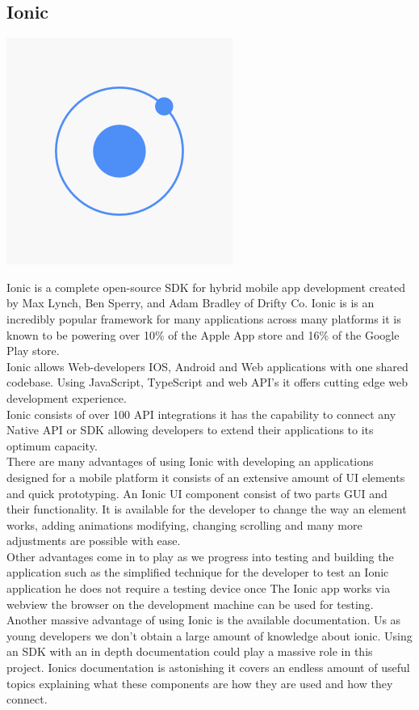 \documentclass[a4paper,12pt]{report}
\begin{document}
\subsection{Ionic}
\includegraphics[scale=.1]{images/ionic.png}

Ionic is a complete open-source SDK for hybrid mobile app development created by Max Lynch, Ben Sperry, and Adam Bradley of Drifty Co.
Ionic is is an incredibly popular framework for many applications across many platforms it is known to be powering over 10\% of the Apple App store and 16\% of the Google Play store.\\
Ionic allows Web-developers IOS, Android and Web applications with one shared codebase. Using JavaScript, TypeScript and web API's it offers cutting edge web development experience.\\
Ionic consists of over 100 API integrations it has the capability to connect any Native API or SDK allowing developers to extend their applications to its optimum capacity.\cite{ionicInsight}\\

There are many advantages of using Ionic with developing an applications designed for a mobile platform it consists of an extensive amount of UI elements and quick prototyping. An Ionic UI component consist of two parts GUI and their functionality. It is available for the developer to change the way an element works, adding animations modifying, changing scrolling and many more adjustments are possible with ease.\\

Other advantages come in to play as we progress into testing and building the application such as the simplified technique for the developer to test an Ionic application he does not require a testing device once The Ionic app works via webview the browser on the development machine can be used for testing.\\
Another massive advantage of using Ionic is the available documentation. Us as young developers we don't obtain a large amount of knowledge about ionic. Using an SDK with an in depth documentation could play a massive role in this project.
Ionics documentation is astonishing it covers an endless amount of useful topics explaining what these components are how they are used and how they connect.\cite{ionicPros}
\end{document}
